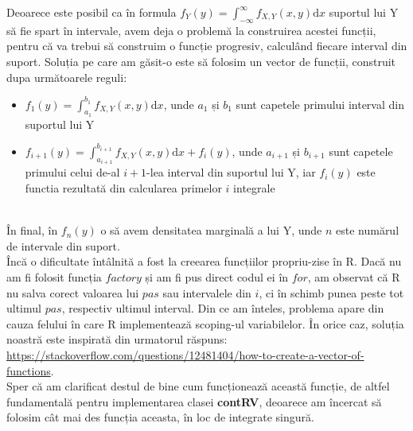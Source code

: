 \documentclass[12pt]{article}
\begin{document}
\indent Deoarece este posibil ca în formula $\displaystyle f_{Y}(y) = \int_{-\infty}^{\infty}f_{X,Y}(x,y)\mathrm{d}x$ suportul lui Y să fie spart în intervale, avem deja o problemă la construirea acestei funcții, pentru că va trebui să construim o funcție progresiv, calculând fiecare interval din suport. Soluția pe care am găsit-o este să folosim un vector de funcții, construit dupa următoarele reguli:
\begin{itemize}
	\item $\displaystyle f_1(y) = \int_{a_1}^{b_1}f_{X,Y}(x,y)\mathrm{d}x$, unde $a_1$ și $b_1$ sunt capetele primului interval din suportul lui Y
	\item $\displaystyle f_{i+1}(y) = \int_{a_{i+1}}^{b_{i+1}} f_{X,Y}(x,y)\mathrm{d}x + f_i(y)$, unde $a_{i+1}$ și $b_{i+1}$ sunt capetele primului celui de-al $i+1$-lea interval din suportul lui Y, iar $f_i(y)$ este functia rezultată din calcularea primelor $i$ integrale
\end{itemize}\hfill \\
\indent În final, în $f_n(y)$ o să avem densitatea marginală a lui Y, unde $n$ este numărul de intervale din suport.\\
\indent Încă o dificultate întâlnită a fost la creearea funcțiilor propriu-zise în R. Dacă nu am fi folosit funcția $factory$ și am fi pus direct codul ei în $for$, am observat că R nu salva corect valoarea lui $pas$ sau intervalele din $i$, ci în schimb punea peste tot ultimul $pas$, respectiv ultimul interval. Din ce am înteles, problema apare din cauza felului în care R implementează scoping-ul variabilelor. În orice caz, soluția noastră este inspirată din urmatorul răspuns: \url{https://stackoverflow.com/questions/12481404/how-to-create-a-vector-of-functions}. \hfill \\
\indent Sper că am clarificat destul de bine cum funcționează această funcție, de altfel fundamentală pentru implementarea clasei \textbf{contRV}, deoarece am încercat să folosim cât mai des funcția aceasta, în loc de integrate singură.\\
\end{document}
